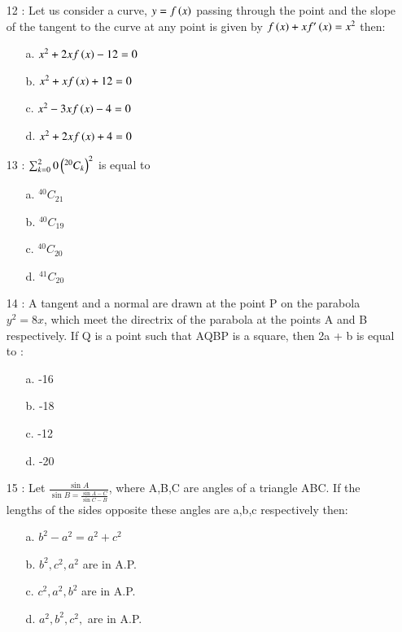 \documentclass[journal]{IEEEtran}
\begin{document}
\begin{enumerate}
\item[12]: Let us consider a curve, $y = f\left(x\right)$ passing through the point  and the slope of the tangent to the curve at any point  is given by $f\left(x\right)+xf'\left(x\right)=x^2$ then:
\begin{enumerate}
     \item [a.] $x^2+2xf\left(x\right)-12=0$
    \item [b.] $x^2+xf\left(x\right)+12=0$
    \item [c.] $x^2-3xf\left(x\right)-4=0$
    \item [d.] $x^2+2xf\left(x\right)+4=0$
\end{enumerate}
\item[13]: $\sum_{k=0}^20 \left(^{20}C_k\right)^2$ is equal to
\begin{enumerate}
     \item [a.] $^{40}C_{21}$
    \item [b.] $^{40}C_{19}$
    \item [c.] $^{40}C_{20}$
    \item [d.] $^{41}C_{20}$
\end{enumerate}
\item[14]: A tangent and a normal are drawn at the point
P on the parabola $y^2 = 8x$, which meet the
directrix of the parabola at the points A and B
respectively. If Q is a point such that AQBP
is a square, then 2a + b is equal to :
\begin{enumerate}
\item [a.] -16
    \item [b.]-18
    \item [c.] -12
    \item [d.] -20
\end{enumerate}
\item[15] : Let $\frac{\sin{A}}{\sin{B}=\frac{\sin{A-C}}{\sin{C-B}}}$, where A,B,C are angles of a triangle ABC. If the lengths of the sides opposite these angles are a,b,c respectively then:
\begin{enumerate}
\item [a.] $b^2-a^2=a^2+c^2$
    \item [b.]$b^2,c^2,a^2$ are in A.P.
    \item [c.] $c^2,a^2,b^2$ are in A.P.
    \item [d.] $a^2,b^2,c^2,$ are in A.P.
\end{enumerate}
\end{enumerate}
\end{document}
